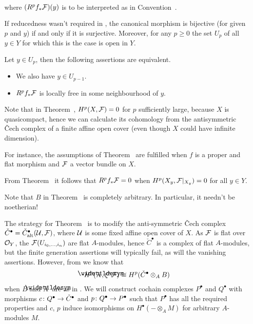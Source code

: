 \documentclass[a4paper,parskip=half,numbers=enddot, DIV=12]{scrreprt}
\renewcommand{\geq}{\geqslant}
\begin{document}
\begin{thm}
\begin{alphanumerate}
\begin{align}
		\end{align}
		where $(R^pf_*\mathcal{F})(y)$ is to be interpreted as in Convention~.
		\item If reducedness wasn't required in , the canonical morphism  is bijective (for given $p$ and $y$) if and only if it is surjective. Moreover, for any $p\geq 0$ the set $U_p$ of all $y\in Y$ for which this is the case is open in $Y$.
		\item Let $y\in U_p$, then the following assertions are equivalent.
		\begin{itemize}
			\item[\itememph{\alpha}] We also have $y\in U_{p-1}$.
			\item[\itememph{\beta}] $R^pf_*\mathcal{F}$ is locally free in some neighbourhood of $y$.
		\end{itemize}
	\end{alphanumerate}
\end{thm}
\begin{rem}
	\begin{alphanumerate}
		\item Note that in Theorem~, $H^p(X,\mathcal{F})=0$ for $p$ sufficiently large, because $X$ is quasicompact, hence we can calculate its cohomology from the antisymmetric \v Cech complex of a finite affine open cover (even though $X$ could have infinite dimension).
		\item For instance, the assumptions of Theorem~ are fulfilled when $f$ is a proper and flat morphism and $\mathcal{F}$ a vector bundle on $X$.
		\item From Theorem~ it follows that $R^pf_*\mathcal{F}=0$ when $H^p(X_y,\mathcal{F}|_{X_y})=0$ for all $y\in Y$.
		\item Note that $B$ in Theorem~ is completely arbitrary. In particular, it needn't be noetherian!
	\end{alphanumerate}
\end{rem}
	The strategy for Theorem~ is to modify the anti-symmetric \v Cech complex $\check{C}^\bullet=\check{C}_{\mathrm{alt}}^\bullet(\mathcal{U},\mathcal{F})$, where $\mathcal{U}$ is some fixed affine open cover of $X$. As $\mathcal{F}$ is flat over $\mathcal{O}_Y$, the $\mathcal{F}(U_{i_0,\ldots,i_n})$ are flat $A$-modules, hence $\check{C}^\bullet$ is a complex of flat $A$-modules, but the finite generation assertions will typically fail, as will the vanishing assertions. However, from  we know that
	\begin{align}\lbl{eq:baseChangeProperty}
		H^p(\snake{X},\xi^*\Ff)\cong H^p(\check{C}^\bullet\otimes_AB)
	\end{align}
	when $B$ and $\snake{X}$ are as in . We will construct cochain complexes $P^\bullet$ and $Q^\bullet$ with morphisms $c\colon Q^\bullet\morphism\check{C}^\bullet$ and $p\colon Q^\bullet\morphism P^\bullet$ such that $P^\bullet$ has all the required properties and $c$, $p$ induce isomorphisms on $H^\bullet(-\otimes_AM)$ for arbitrary $A$-modules $M$.
	
\end{document}
